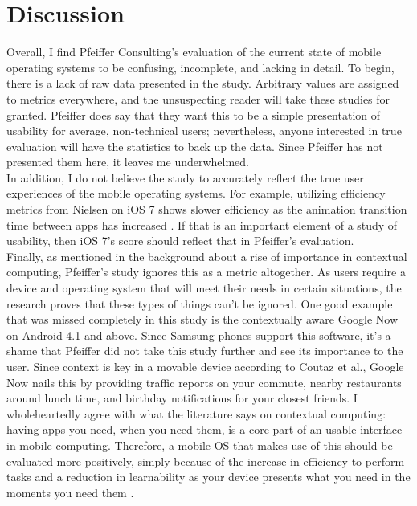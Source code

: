 \documentclass[11pt]{article}
\begin{document}
\section{Discussion}
Overall, I find Pfeiffer Consulting's evaluation of the current state of mobile operating systems to be confusing, incomplete, and lacking in detail. To begin, there is a lack of raw data presented in the study. Arbitrary values are assigned to metrics everywhere, and the unsuspecting reader will take these studies for granted. Pfeiffer does say that they want this to be a simple presentation of usability for average, non-technical users; nevertheless, anyone interested in true evaluation will have the statistics to back up the data. Since Pfeiffer has not presented them here, it leaves me underwhelmed. \\
\indent In addition, I do not believe the study to accurately reflect the true user experiences of the mobile operating systems. For example, utilizing efficiency metrics from Nielsen on iOS 7 shows slower efficiency as the animation transition time between apps has increased \cite{Nielsen}. If that is an important element of a study of usability, then iOS 7's score should reflect that in Pfeiffer's evaluation. \\
\indent Finally, as mentioned in the background about a rise of importance in contextual computing, Pfeiffer's study ignores this as a metric altogether. As users require a device and operating system that will meet their needs in certain situations, the research proves that these types of things can't be ignored. One good example that was missed completely in this study is the contextually aware Google Now on Android 4.1 and above. Since Samsung phones support this software, it's a shame that Pfeiffer did not take this study further and see its importance to the user. Since context is key in a movable device according to Coutaz et al., Google Now nails this by providing traffic reports on your commute, nearby restaurants around lunch time, and birthday notifications for your closest friends. \cite{GoogleNow} I wholeheartedly agree with what the literature says on contextual computing: having apps you need, when you need them, is a core part of an usable interface in mobile computing. Therefore, a mobile OS that makes use of this should be evaluated more positively, simply because of the increase in efficiency to perform tasks and a reduction in learnability as your device presents what you need in the moments you need them \cite{Nielsen}.
\end{document}
